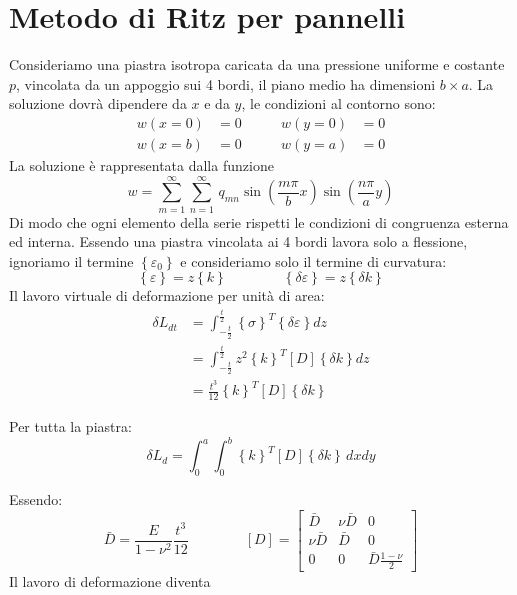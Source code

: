 \section{Metodo di Ritz per pannelli}

Consideriamo una piastra isotropa caricata da una pressione uniforme e costante $p$, vincolata da un appoggio sui 4 bordi, il piano medio ha dimensioni $b\times a$. La soluzione dovrà dipendere da $x$ e da $y$, le condizioni al contorno sono:
\begin{align*}
    w(x=0)&=0\qquad &w(y=0)&=0\\
    w(x=b)&=0\qquad &w(y=a)&=0
\end{align*}
La soluzione è rappresentata dalla funzione
\begin{equation*}
    w= \sum^\infty_{m=1}  \sum^\infty_{n=1}\,q_{mn}\sin{\left(\frac{m\pi}{b}x\right)}  \sin{\left(\frac{n\pi}{a}y\right)}
\end{equation*}
Di modo che ogni elemento della serie rispetti le condizioni di congruenza esterna ed interna.
Essendo una piastra vincolata ai 4 bordi lavora solo a flessione, ignoriamo il termine $\left\{\varepsilon_0 \right\}$ e consideriamo solo il termine di curvatura:
\begin{equation*}
    \left\{\varepsilon \right\}=z\left\{k \right\}\qquad\qquad    \left\{\delta\varepsilon \right\}=z\left\{\delta k \right\}
\end{equation*}
Il lavoro virtuale di deformazione per unità di area:
\begin{align*}
 \delta L_{dt}  &= \int_{-\frac{t}{2}}^{\frac{t}{2}}      \left\{\sigma\right\}^T   \left\{\delta\varepsilon\right\}dz\\
   &= \int_{-\frac{t}{2}}^{\frac{t}{2}}    z^2  \left\{k\right\}^T   [D]\left\{\delta k\right\}dz\\
   &= \frac{t^3}{12} \left\{k\right\}^T   [D]\left\{\delta k\right\}
\end{align*}

Per tutta la piastra:
\begin{equation*}
    \delta L_d=\int_0^a\int_0^b  \left\{k\right\}^T   [D]\left\{\delta k\right\}\,dx dy
\end{equation*}

Essendo:
\begin{equation*}
    \bar{D}=\frac{E}{1-\nu^2}\frac{t^3}{12} \qquad\qquad
[D]=\left[
\begin{array}{ccc}
\displaystyle \bar{D} & \displaystyle \nu\bar{D} & \displaystyle 0\\
\displaystyle \nu\bar{D} & \displaystyle \bar{D} & \displaystyle 0 \\
\displaystyle 0& \displaystyle 0 & \displaystyle \bar{D}\frac{1-\nu}{2}
\end{array}
\right]    
\end{equation*}
Il lavoro di deformazione diventa


